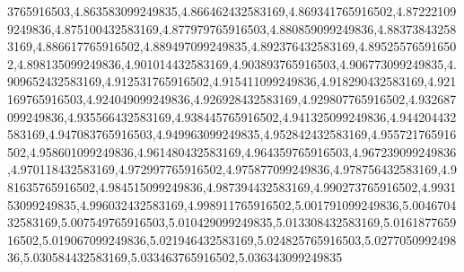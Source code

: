 3765916503,4.863583099249835,4.866462432583169,4.869341765916502,4.872221099249836,4.875100432583169,4.877979765916503,4.880859099249836,4.883738432583169,4.886617765916502,4.889497099249835,4.892376432583169,4.895255765916502,4.898135099249836,4.901014432583169,4.903893765916503,4.906773099249835,4.909652432583169,4.912531765916502,4.915411099249836,4.918290432583169,4.921169765916503,4.924049099249836,4.926928432583169,4.929807765916502,4.932687099249836,4.935566432583169,4.938445765916502,4.941325099249836,4.944204432583169,4.947083765916503,4.949963099249835,4.952842432583169,4.955721765916502,4.958601099249836,4.961480432583169,4.964359765916503,4.967239099249836,4.970118432583169,4.972997765916502,4.975877099249836,4.978756432583169,4.981635765916502,4.984515099249836,4.987394432583169,4.990273765916502,4.993153099249835,4.996032432583169,4.998911765916502,5.001791099249836,5.004670432583169,5.007549765916503,5.010429099249835,5.013308432583169,5.016187765916502,5.019067099249836,5.021946432583169,5.024825765916503,5.027705099249836,5.030584432583169,5.033463765916502,5.036343099249835
